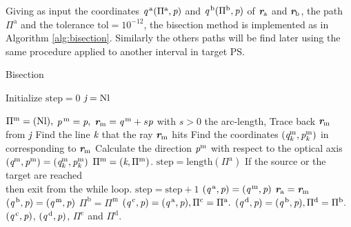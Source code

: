 Giving as input the coordinates $\textit{q}^{\,\textrm{a}}(\Pi^{\textrm{a}}, \textit{p})$ and $\textit{q}^{\,\textrm{b}}(\Pi^{\textrm{b}}, \textit{p})$ of $\textit{\textbf{r}}_{\textrm{a}}$ and $\textit{\textbf{r}}_{\textrm{b}}$, the path $\Pi^\textrm{a}$ and the tolerance $\textrm{tol}= 10^{-12}$, the bisection method is implemented as in Algorithm \ref{alg:bisection}. Similarly the others paths will be find later using the same procedure applied to another interval in target PS.
\begin{algorithm}
\caption{Bisection}\label{alg:bisection}
Initialize $\textrm{step} = 0$ $\textit{j} = \textrm{Nl}$
\begin{algorithmic}[1]
\State $\Pi^{\textrm{m}}= (\textrm{Nl}),$
\State $\textit{p}^{\,\textrm{m}}=\textit{p},$
\State $\textit{\textbf{r}}_{\textrm{m}}= \textit{q}^{\,\textrm{m}}+s \textit{p}$ with $s>0$ the arc-length,
\State Trace back $\textit{\textbf{r}}_{\textrm{m}}$ from $\textit{j}$
\State Find the line $\textit{k}$ that the ray $\textit{\textbf{r}}_{\textrm{m}}$ hits 
\State Find the coordinates $(\textit{q}^{\textrm{m}}_{\textit{k}}, \textit{p}^{\textrm{m}}_{\textit{k}})$ in  corresponding to $\textit{\textbf{r}}_{\textrm{m}}$
\State Calculate the direction $\textit{p}^{\textrm{m}}$ with respect to the optical axis
\State $(\textit{q}^{\textrm{m}}, \textit{p}^{\textrm{m}}) = (\textit{q}^{\textrm{m}}_{\textit{k}}, \textit{p}^{\textrm{m}}_{\textit{k}})$
\State $\Pi^{\textrm{m}}=(\textit{k},\Pi^{\textrm{m}})$.
\State $\textrm{step} = \mbox{length}(\Pi^\textrm{a})$ \Comment If the source or the target are reached \\  \Comment then exit from the while loop.
\Else \State $\textrm{step}=\textrm{step}+1$ 
\EndIf
\EndWhile
{}
\State $(\textit{q}^{\,\textrm{a}}, \textit{p})= (\textit{q}^{\,\textrm{m}}, \textit{p})$
\State $\textit{\textbf{r}}_{\textrm{a}}= \textit{\textbf{r}}_{\textrm{m}}$
\Else 
\State $(\textit{q}^{\,\textrm{b}}, \textit{p})= (\textit{q}^{\,\textrm{m}}, \textit{p})$
\State $\Pi^\textrm{b} =  \Pi^{\textrm{m}}$
\EndIf
\EndWhile
\State $(\textit{q}^{\,\textrm{c}}, \textit{p})= (\textit{q}^{\,\textrm{a}}, \textit{p}), \Pi^\textrm{c}= \Pi^{\textrm{a}}.$
\State $(\textit{q}^{\,\textrm{d}}, \textit{p})= (\textit{q}^{\,\textrm{b}}, \textit{p}), \Pi^\textrm{d}= \Pi^{\textrm{b}}.$
\State \Return $(\textit{q}^{\,\textrm{c}}, \textit{p})$, $(\textit{q}^{\,\textrm{d}}, \textit{p})$, $\Pi^{\textrm{c}}$ and $\Pi^{\textrm{d}}$.
\end{algorithmic}
\end{algorithm}
